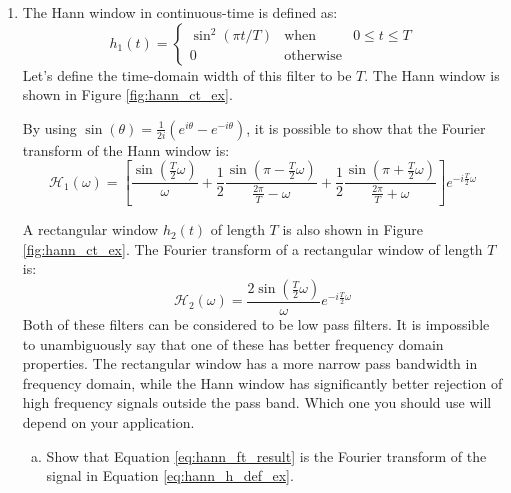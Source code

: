 \begin{enumerate}
  \item The Hann window in continuous-time is defined as:
        \begin{equation} h_1(t)= \left\{ \begin{array}{ccc} \sin^2(\pi t/T)
             & \mathrm{when} & 0 \le t \le T \\ 0 & \mathrm{otherwise}
             &\end{array} \right.  \label{eq:hann_h_def_ex} \end{equation}
        Let's define the time-domain width of this filter to be $T$. The
        Hann window is shown in Figure \ref{fig:hann_ct_ex}.

        By using $\sin(\theta) = \frac{1}{2i}(e^{i\theta} - e^{-i\theta})$, it is possible to 
        show that the Fourier transform of the Hann window is:
        \begin{equation}
          \mathcal{H}_1(\omega) = \left[ \frac{\sin(\frac{T}{2}\omega)}{\omega} + \frac{1}{2}\frac{\sin(\pi-\frac{T}{2}\omega)}{\frac{2\pi}{T}-\omega} +  \frac{1}{2}\frac{\sin(\pi+\frac{T}{2}\omega)}{\frac{2\pi}{T}+\omega}  \right] e^{-i\frac{T}{2}\omega}
          \label{eq:hann_ft_result}
        \end{equation}

        A rectangular window $h_2(t)$ of length $T$ is also shown in
        Figure \ref{fig:hann_ct_ex}. The Fourier transform of a
        rectangular window of length $T$
        is:
        \begin{equation}
          \mathcal{H}_2(\omega)= \frac{2\sin(\frac{T}{2}\omega)}{\omega}e^{-i \frac{T}{2}\omega}
        \end{equation}
        Both of these filters can be considered to be low pass filters. It is
        impossible to unambiguously say that one of these has better frequency
        domain properties. The rectangular window has a more narrow pass bandwidth 
        in frequency domain, while the Hann window has significantly
        better rejection of high frequency signals outside the pass
        band. Which one you should use will depend on your application.

        \begin{enumerate}[a)]
          \item Show that Equation \ref{eq:hann_ft_result} is the Fourier transform of the 
                signal in Equation \ref{eq:hann_h_def_ex}.


\end{enumerate}
\end{enumerate}

